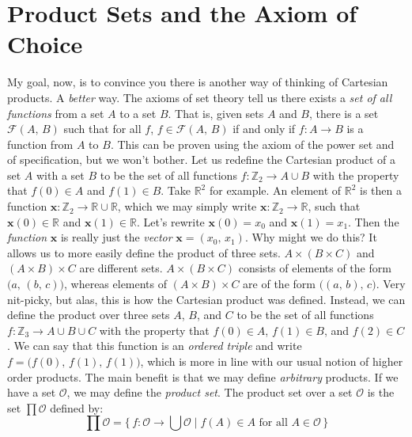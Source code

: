 \documentclass{article}
\theoremstyle{plain}
\theoremstyle{normal}
\newenvironment{definition}{%
    \pushQED{\qed}\renewcommand{\qedsymbol}{$\blacksquare$}\definitionx%
}{%
    \popQED\enddefinitionx%
}
\begin{document}
    \section{Product Sets and the Axiom of Choice}
        My goal, now, is to convince you there is another way of thinking of
        Cartesian products. A \textit{better} way. The axioms of set theory
        tell us there exists a \textit{set of all functions} from a set $A$ to
        a set $B$. That is, given sets $A$
        and $B$, there is a set $\mathcal{F}(A,\,B)$ such that for all $f$,
        $f\in\mathcal{F}(A,\,B)$ if and only if $f:A\rightarrow{B}$ is a
        function from $A$ to $B$. This can be proven using the axiom of the
        power set and of specification, but we won't bother. Let us redefine the
        Cartesian product of a set $A$ with a set $B$ to be the set of all
        functions $f:\mathbb{Z}_{2}\rightarrow{A}\cup{B}$ with the property
        that $f(0)\in{A}$ and $f(1)\in{B}$. Take $\mathbb{R}^{2}$ for example.
        An element of $\mathbb{R}^{2}$ is then a function
        $\mathbf{x}:\mathbb{Z}_{2}\rightarrow\mathbb{R}\cup\mathbb{R}$,
        which we may simply write
        $\mathbf{x}:\mathbb{Z}_{2}\rightarrow\mathbb{R}$, such that
        $\mathbf{x}(0)\in\mathbb{R}$ and $\mathbf{x}(1)\in\mathbb{R}$.
        Let's rewrite $\mathbf{x}(0)=x_{0}$ and $\mathbf{x}(1)=x_{1}$.
        Then the \textit{function} $\mathbf{x}$ is really just the
        \textit{vector} $\mathbf{x}=(x_{0},\,x_{1})$. Why might we do this?
        It allows us to more easily define the product of three sets.
        $A\times(B\times{C})$ and $(A\times{B})\times{C}$ are different sets.
        $A\times(B\times{C})$ consists of elements of the form
        $\big(a,\,(b,\,c)\big)$, whereas elements of
        $(A\times{B})\times{C}$ are of the form
        $\big((a,\,b),\,c\big)$. Very nit-picky, but alas, this is how the
        Cartesian product was defined. Instead, we can define the product over
        three sets $A$, $B$, and $C$ to be the set of all functions
        $f:\mathbb{Z}_{3}\rightarrow{A}\cup{B}\cup{C}$ with the property that
        $f(0)\in{A}$, $f(1)\in{B}$, and $f(2)\in{C}$. We can say that this
        function is an \textit{ordered triple} and write
        $f=\big(f(0),\,f(1),\,f(1)\big)$, which is more in line with our usual
        notion of higher order products. The main benefit is that we may define
        \textit{arbitrary} products. If we have a set $\mathcal{O}$, we may
        define the \textit{product set}.
        \begin{definition}[\textbf{Product Set}]
            The product set over a set $\mathcal{O}$ is the set
            $\prod\mathcal{O}$ defined by:
            \begin{equation}
                \prod\mathcal{O}=\{\,f:\mathcal{O}\rightarrow\bigcup\mathcal{O}
                    \;|\;f(A)\in{A}\textrm{ for all }A\in\mathcal{O}\,\}
            \end{equation}
        \end{definition}
\end{document}
